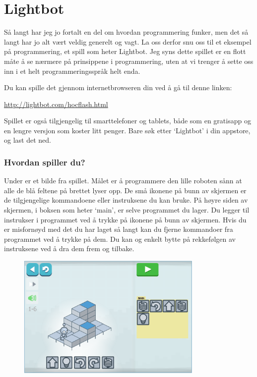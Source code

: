 \documentclass[a4paper, 11pt, notitlepage]{article}
\begin{document}
\clearpage

\section*{Lightbot}

Så langt har jeg jo fortalt en del om hvordan programmering funker, men det så langt har jo alt vært veldig generelt og vagt. La oss derfor snu oss til et eksempel på programmering, et spill som heter Lightbot. Jeg syns dette spillet er en flott måte å se nærmere på prinsippene i programmering, uten at vi trenger å sette oss inn i et helt programmeringsspråk helt enda.

Du kan spille det gjennom internetbrowseren din ved å gå til denne linken:

\url{http://lightbot.com/hocflash.html}

Spillet er også tilgjengelig til smarttelefoner og tablets, både som en gratisapp og en lengre versjon som koster litt penger. Bare søk etter `Lightbot' i din appstore, og last det ned.


\subsubsection*{Hvordan spiller du?}
Under er et bilde fra spillet. Målet er å programmere den lille roboten sånn at alle de blå feltene på brettet lyser opp. De små ikonene på bunn av skjermen er de tilgjengelige kommandoene eller instruksene du kan bruke. På høyre siden av skjermen, i boksen som heter `main',  er selve programmet du lager. Du legger til instrukser i programmet ved å trykke på ikonene på bunn av skjermen. Hvis du er misfornøyd med det du har laget så langt kan du fjerne kommandoer fra programmet ved å trykke på dem.  Du kan og enkelt bytte på rekkefølgen av instruksene ved å dra dem frem og tilbake.

\begin{figure}[h]
\centering
\includegraphics[width=0.8\textwidth]{fig/lightbot1}
\end{figure}
\end{document}
